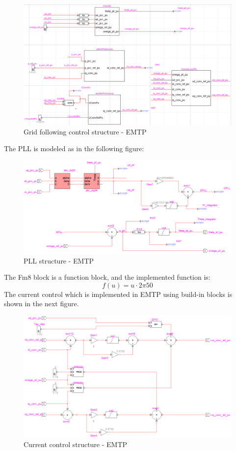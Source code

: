 \documentclass{report}
\begin{document}
\begin{figure}[H]
    \centering
    \includegraphics[scale = 0.51]{Figure_1VSC/1VSC_control_EMTP.png}
    \caption{Grid following control structure - EMTP}
    \label{fig:1VSC_control_EMTP}
\end{figure}
The PLL is modeled as in the following figure:
\begin{figure}[H]
    \centering
    \includegraphics[scale = 0.5]{Figure_1VSC/1VSC_PLL_EMTP.png}
    \caption{PLL structure - EMTP}
    \label{fig:1VSC_PLL_EMTP}
\end{figure}
The Fm8 block is a function block, and the implemented function is:
\begin{equation}
    f(u) = u\cdot 2\pi50
\end{equation}
The current control which is implemented in EMTP using build-in blocks is shown in the next figure.
\begin{figure}[H]
    \centering
    \includegraphics[scale = 0.63]{Figure_1VSC/1VSC_current_control_EMTP.png}
    \caption{Current control structure - EMTP}
    \label{fig:1VSC_current_control_EMTP}
\end{figure}
\end{document}
